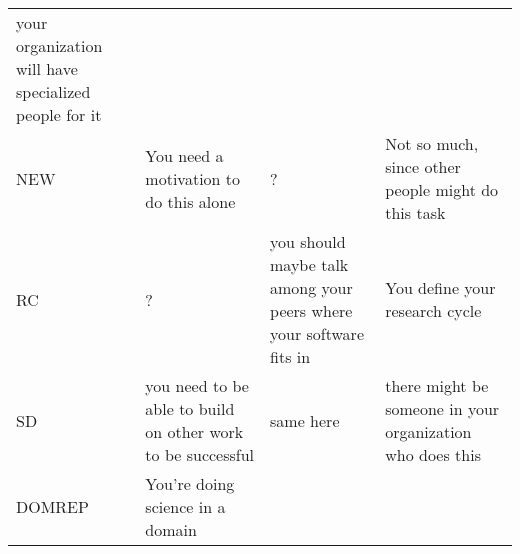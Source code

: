 \documentclass[a4paper
]{article}
\begin{document}
\begin{landscape}
\begin{longtable}[]{@{}llll@{}}
\begin{minipage}[t]{0.14\columnwidth}
your organization will have specialized people for it\strut
\end{minipage}\tabularnewline
\begin{minipage}[t]{0.19\columnwidth}\raggedright
NEW\strut
\end{minipage} & \begin{minipage}[t]{0.28\columnwidth}\raggedright
You need a motivation to do this alone\strut
\end{minipage} & \begin{minipage}[t]{0.28\columnwidth}\raggedright
?\strut
\end{minipage} & \begin{minipage}[t]{0.14\columnwidth}\raggedright
Not so much, since other people might do this task\strut
\end{minipage}\tabularnewline
\begin{minipage}[t]{0.19\columnwidth}\raggedright
RC\strut
\end{minipage} & \begin{minipage}[t]{0.28\columnwidth}\raggedright
?\strut
\end{minipage} & \begin{minipage}[t]{0.28\columnwidth}\raggedright
you should maybe talk among your peers where your software fits in\strut
\end{minipage} & \begin{minipage}[t]{0.14\columnwidth}\raggedright
You define your research cycle\strut
\end{minipage}\tabularnewline
\begin{minipage}[t]{0.19\columnwidth}\raggedright
SD\strut
\end{minipage} & \begin{minipage}[t]{0.28\columnwidth}\raggedright
you need to be able to build on other work to be successful\strut
\end{minipage} & \begin{minipage}[t]{0.28\columnwidth}\raggedright
same here\strut
\end{minipage} & \begin{minipage}[t]{0.14\columnwidth}\raggedright
there might be someone in your organization who does this\strut
\end{minipage}\tabularnewline
\begin{minipage}[t]{0.19\columnwidth}\raggedright
DOMREP\strut
\end{minipage} & \begin{minipage}[t]{0.28\columnwidth}\raggedright
You're doing science in a domain\strut

\end{minipage}
\end{longtable}
\end{landscape}
\end{document}
